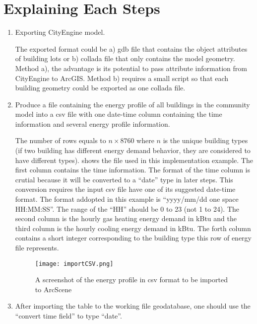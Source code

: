 \section{Explaining Each Steps}
\begin{enumerate}[1)]
\item Exporting CityEngine model. 

  The exported format could be a) gdb file that contains the object
  attributes of building lots or b) collada file that only contains
  the model geometry. Method a), the advantage is its potential to
  pass attribute information from CityEngine to ArcGIS. Method b)
  requires a small script so that each building geometry could be
  exported as one collada file.

\item Produce a file containing the energy profile of all buildings in
  the community model into a csv file with one date-time column
  containing the time information and several energy profile
  information. 

  The number of rows equals to $n \times 8760$ where $n$ is the unique
  building types (if two building has different energy demand
  behavior, they are considered to have different types).
   shows the file used in this implementation
  example. The first column contains the time information. The format
  of the time column is crutial because it will be converted to a
  ``date'' type in later steps. This conversion requires the input csv
  file have one of its suggested date-time format. The format addopted
  in this example is ``yyyy/mm/dd one space HH:MM:SS''. The range of
  the ``HH'' should be 0 to 23 (not 1 to 24). The second column is the
  hourly gas heating energy demand in kBtu and the third column is the
  hourly cooling energy demand in kBtu. The forth column contains a
  short integer corresponding to the building type this row of energy
  file represents.

\begin{figure}[h!]
  \centering
  \texttt{[image: importCSV.png]}
  \caption[Imported CSV]{A screenshot of the energy profile in csv
    format to be imported to ArcScene}
  \label{fig:importCSV}
\end{figure}

\item After importing the table to the working file geodatabase, one
  should use the ``convert time field'' to type ``date''.


\end{enumerate}
